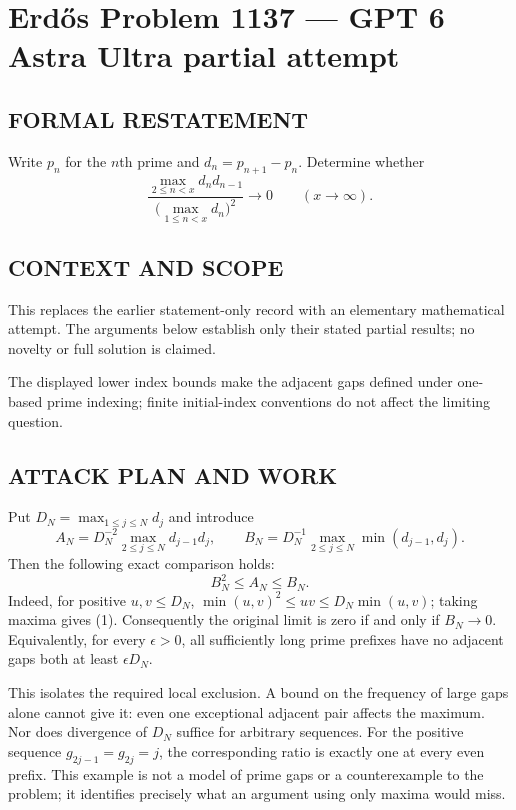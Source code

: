 \section*{Erd\H{o}s Problem 1137 --- GPT 6 Astra Ultra partial attempt}


\subsection*{FORMAL RESTATEMENT}
Write $p_n$ for the $n$th prime and $d_n=p_{n+1}-p_n$. Determine whether
\[
\frac{\max_{2\leq n<x}d_nd_{n-1}}{\bigl(\max_{1\leq n<x}d_n\bigr)^2}\longrightarrow0
\qquad(x\to\infty).
\]

\subsection*{CONTEXT AND SCOPE}
This replaces the earlier statement-only record with an elementary mathematical attempt. The arguments below establish only their stated partial results; no novelty or full solution is claimed.

The displayed lower index bounds make the adjacent gaps defined under one-based prime indexing; finite initial-index conventions do not affect the limiting question.

\subsection*{ATTACK PLAN AND WORK}
Put $D_N=\max_{1\le j\le N}d_j$ and introduce
\[
A_N=D_N^{-2}\max_{2\le j\le N}d_{j-1}d_j,
\qquad B_N=D_N^{-1}\max_{2\le j\le N}\min(d_{j-1},d_j).
\]
Then the following exact comparison holds:
\[ B_N^2\le A_N\le B_N. \tag{1}\]
Indeed, for positive $u,v\le D_N$, $\min(u,v)^2\le uv\le D_N\min(u,v)$;
taking maxima gives (1). Consequently the original limit is zero if and only
if $B_N\to0$. Equivalently, for every $\epsilon>0$, all sufficiently long prime
prefixes have no adjacent gaps both at least $\epsilon D_N$.

This isolates the required local exclusion. A bound on the frequency of large
gaps alone cannot give it: even one exceptional adjacent pair affects the maximum.
Nor does divergence of $D_N$ suffice for arbitrary sequences. For the positive
sequence $g_{2j-1}=g_{2j}=j$, the corresponding ratio is exactly one at every even
prefix. This example is not a model of prime gaps or a counterexample to the
problem; it identifies precisely what an argument using only maxima would miss.

